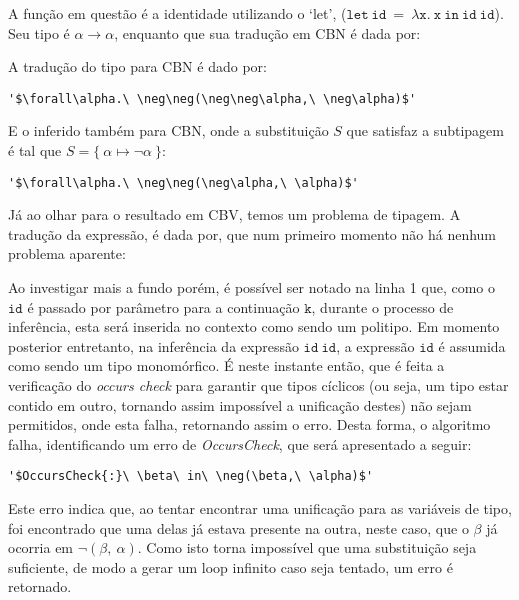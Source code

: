 A função em questão é a identidade utilizando o `let', ($\mathtt{let\ id\ =\ \lambda x.\ x\ in\ id\ id}$).
Seu tipo é $\alpha \to \alpha$, enquanto que sua tradução em CBN é dada por:

A tradução do tipo para CBN é dado por:
\lstset{extendedchars=false, escapeinside=''}
\begin{lstlisting}[style=output,caption={Tradução em CBN da identidade com `let'}]
  '$\forall\alpha.\ \neg\neg(\neg\neg\alpha,\ \neg\alpha)$'
\end{lstlisting}
E o inferido também para CBN, onde a substituição $S$ que satisfaz a subtipagem é tal que $S = \{\ \alpha \mapsto \neg\alpha \ \}$:
\lstset{extendedchars=false, escapeinside=''}
\begin{lstlisting}[style=output,caption={Inferência da identidade com `let' traduzido em CBN}]
  '$\forall\alpha.\ \neg\neg(\neg\alpha,\ \alpha)$'
\end{lstlisting}
Já ao olhar para o resultado em CBV, temos um problema de tipagem.
A tradução da expressão, é dada por, que num primeiro momento não há nenhum problema aparente:

Ao investigar mais a fundo porém, é possível ser notado na linha 1 que, como o $\mathtt{id}$ é passado por parâmetro para a continuação $\mathtt{k}$, durante o processo de inferência, esta será inserida no contexto como sendo um politipo.
Em momento posterior entretanto, na inferência da expressão $\mathtt{id\ id}$, a expressão $\mathtt{id}$ é assumida como sendo um tipo monomórfico.
É neste instante então, que é feita a verificação do \textit{occurs check} para garantir que tipos cíclicos (ou seja, um tipo estar contido em outro, tornando assim impossível a unificação destes) não sejam permitidos, onde esta falha, retornando assim o erro.
Desta forma, o algoritmo falha, identificando um erro de \textit{OccursCheck}, que será apresentado a seguir:
\lstset{extendedchars=false, escapeinside=''}
\begin{lstlisting}[style=output,caption={Erro de Inferência da identidade com `let' traduzido em CBV}]
  '$OccursCheck{:}\ \beta\ in\ \neg(\beta,\ \alpha)$'
\end{lstlisting}
Este erro indica que, ao tentar encontrar uma unificação para as variáveis de tipo, foi encontrado que uma delas já estava presente na outra, neste caso, que o $\beta$ já ocorria em $\neg(\beta,\ \alpha)$.
Como isto torna impossível que uma substituição seja suficiente, de modo a gerar um loop infinito caso seja tentado, um erro é retornado.

